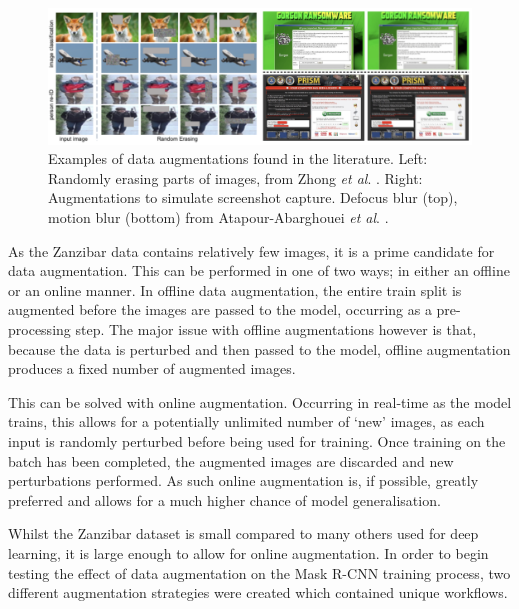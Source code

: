 \begin{figure}[h]
	\begin{center}
		\includegraphics[scale=0.45]{Chapter3/figs/data-augs.png}
	\end{center}
	\caption[Examples of data augmentations found in the literature.]{Examples of data augmentations found in the literature. Left: Randomly erasing parts of images, from Zhong \textit{et al}. \cite{zhong_random_2017}. Right: Augmentations to simulate screenshot capture. Defocus blur (top), motion blur (bottom) from Atapour-Abarghouei \textit{et al}. \cite{atapour-abarghouei_kings_2019}.}
	\label{fig:data-aug-examples}
\end{figure}

As the Zanzibar data contains relatively few images, it is a prime candidate for data augmentation. This can be performed in one of two ways; in either an offline or an online manner. In offline data augmentation, the entire train split is augmented before the images are passed to the model, occurring as a pre-processing step. The major issue with offline augmentations however is that, because the data is perturbed and then passed to the model, offline augmentation produces a fixed number of augmented images. 

This can be solved with online augmentation. Occurring in real-time as the model trains, this allows for a potentially unlimited number of `new' images, as each input is randomly perturbed before being used for training. Once training on the batch has been completed, the augmented images are discarded and new perturbations performed. As such online augmentation is, if possible, greatly preferred and allows for a much higher chance of model generalisation. 

Whilst the Zanzibar dataset is small compared to many others used for deep learning, it is large enough to allow for online augmentation. In order to begin testing the effect of data augmentation on the Mask R-CNN training process, two different augmentation strategies were created which contained unique workflows. 

